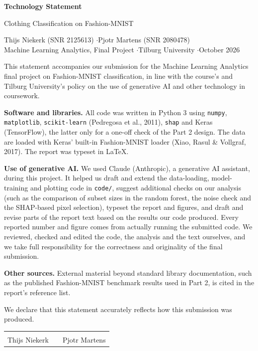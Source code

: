 \documentclass[11pt,a4paper]{article}
\begin{document}
\begin{center}
{\Large\bfseries Technology Statement\par}
\vspace{0.3cm}
{\large Clothing Classification on Fashion-MNIST\par}
\vspace{0.5cm}
Thijs Niekerk (SNR 2125613) \quad$\cdot$\quad Pjotr Martens (SNR 2080478)\\[2pt]
Machine Learning Analytics, Final Project \quad$\cdot$\quad Tilburg University \quad$\cdot$\quad October 2026
\end{center}
\vspace{0.4cm}

This statement accompanies our submission for the Machine Learning Analytics final project on Fashion-MNIST classification, in line with the course's and Tilburg University's policy on the use of generative AI and other technology in coursework.

\textbf{Software and libraries.} All code was written in Python 3 using \texttt{numpy}, \texttt{matplotlib}, \texttt{scikit-learn} (Pedregosa et al., 2011), \texttt{shap} and Keras (TensorFlow), the latter only for a one-off check of the Part 2 design. The data are loaded with Keras' built-in Fashion-MNIST loader (Xiao, Rasul \& Vollgraf, 2017). The report was typeset in \LaTeX{}.

\textbf{Use of generative AI.} We used Claude (Anthropic), a generative AI assistant, during this project. It helped us draft and extend the data-loading, model-training and plotting code in \texttt{code/}, suggest additional checks on our analysis (such as the comparison of subset sizes in the random forest, the noise check and the SHAP-based pixel selection), typeset the report and figures, and draft and revise parts of the report text based on the results our code produced. Every reported number and figure comes from actually running the submitted code. We reviewed, checked and edited the code, the analysis and the text ourselves, and we take full responsibility for the correctness and originality of the final submission.

\textbf{Other sources.} External material beyond standard library documentation, such as the published Fashion-MNIST benchmark results used in Part 2, is cited in the report's reference list.

\vspace{1em}
We declare that this statement accurately reflects how this submission was produced.

\vspace{2.5em}
\begin{tabular}{@{}p{6.5cm}p{1cm}p{6.5cm}@{}}
\hrulefill & & \hrulefill \\
Thijs Niekerk & & Pjotr Martens \\
\end{tabular}
\end{document}
